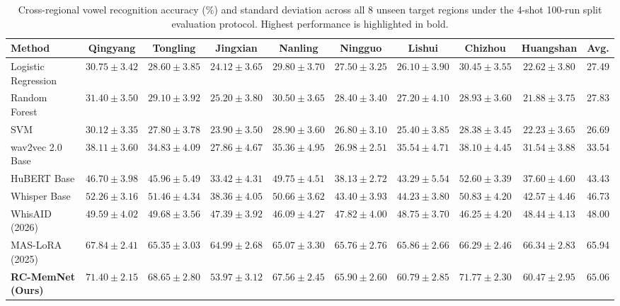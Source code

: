 \documentclass[letterpaper]{article}
\begin{document}
\begin{table}[t]
\centering
\caption{Cross-regional vowel recognition accuracy (\%) and standard deviation across all 8 unseen target regions under the 4-shot 100-run split evaluation protocol. Highest performance is highlighted in bold.}
\label{tab:supp_main_results_full}
\small
\renewcommand{\arraystretch}{1.08}
\begin{tabular*}{\textwidth}{@{\extracolsep{\fill}}lccccccccc@{}}
\toprule
Method & Qingyang & Tongling & Jingxian & Nanling & Ningguo & Lishui & Chizhou & Huangshan & Avg. \\
\midrule
Logistic Regression & $30.75 \pm 3.42$ & $28.60 \pm 3.85$ & $24.12 \pm 3.65$ & $29.80 \pm 3.70$ & $27.50 \pm 3.25$ & $26.10 \pm 3.90$ & $30.45 \pm 3.55$ & $22.62 \pm 3.80$ & 27.49 \\
Random Forest & $31.40 \pm 3.50$ & $29.10 \pm 3.92$ & $25.20 \pm 3.80$ & $30.50 \pm 3.65$ & $28.40 \pm 3.40$ & $27.20 \pm 4.10$ & $28.93 \pm 3.60$ & $21.88 \pm 3.75$ & 27.83 \\
SVM & $30.12 \pm 3.35$ & $27.80 \pm 3.78$ & $23.90 \pm 3.50$ & $28.90 \pm 3.60$ & $26.80 \pm 3.10$ & $25.40 \pm 3.85$ & $28.38 \pm 3.45$ & $22.23 \pm 3.65$ & 26.69 \\
wav2vec 2.0 Base & $38.11 \pm 3.60$ & $34.83 \pm 4.09$ & $27.86 \pm 4.67$ & $35.36 \pm 4.95$ & $26.98 \pm 2.51$ & $35.54 \pm 4.71$ & $38.10 \pm 4.45$ & $31.54 \pm 3.88$ & 33.54 \\
HuBERT Base & $46.70 \pm 3.98$ & $45.96 \pm 5.49$ & $33.42 \pm 4.31$ & $49.75 \pm 4.51$ & $38.13 \pm 2.72$ & $43.29 \pm 5.54$ & $52.60 \pm 3.39$ & $37.60 \pm 4.60$ & 43.43 \\
Whisper Base & $52.26 \pm 3.16$ & $51.46 \pm 4.34$ & $38.36 \pm 4.05$ & $50.66 \pm 3.62$ & $43.40 \pm 3.93$ & $44.23 \pm 3.80$ & $50.83 \pm 4.20$ & $42.57 \pm 4.46$ & 46.73 \\
WhisAID (2026) & $49.59 \pm 4.02$ & $49.68 \pm 3.56$ & $47.39 \pm 3.92$ & $46.09 \pm 4.27$ & $47.82 \pm 4.00$ & $48.75 \pm 3.70$ & $46.25 \pm 4.20$ & $48.44 \pm 4.13$ & 48.00 \\
MAS-LoRA (2025) & $67.84 \pm 2.41$ & $65.35 \pm 3.03$ & $64.99 \pm 2.68$ & $65.07 \pm 3.30$ & $65.76 \pm 2.76$ & $65.86 \pm 2.66$ & $66.29 \pm 2.46$ & $66.34 \pm 2.83$ & 65.94 \\
\midrule
\textbf{RC-MemNet (Ours)} & $\mathbf{71.40 \pm 2.15}$ & $\mathbf{68.65 \pm 2.80}$ & $\mathbf{53.97 \pm 3.12}$ & $\mathbf{67.56 \pm 2.45}$ & $\mathbf{65.90 \pm 2.60}$ & $\mathbf{60.79 \pm 2.85}$ & $\mathbf{71.77 \pm 2.30}$ & $\mathbf{60.47 \pm 2.95}$ & $\mathbf{65.06}$ \\
\bottomrule
\end{tabular*}
\end{table}
\end{document}
